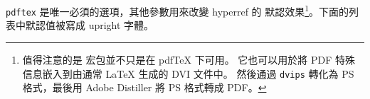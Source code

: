 \texttt{pdftex} 是唯一必須的選項，其他參數用來改變 hyperref 的
默認效果\footnote{值得注意的是  宏包並不只是在 pdf\TeX{} 下可用。
它也可以用於將 PDF 特殊信息嵌入到由通常 \LaTeX{} 生成的 DVI 文件中。
然後通過 \texttt{dvips} 轉化為 PS 格式，最後用 Adobe
Distiller 將 PS 格式轉成 PDF。}。下面的列表中默認值被寫成 upright 字體。



